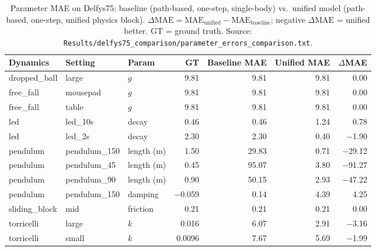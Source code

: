 \begin{table}[t]
  \centering
  \caption{Parameter MAE on Delfys75: baseline (path-based, one-step, single-body) vs.\ unified model (path-based, one-step, unified physics block). $\Delta\mathrm{MAE} = \mathrm{MAE}_{\mathrm{unified}} - \mathrm{MAE}_{\mathrm{baseline}}$; negative $\Delta\mathrm{MAE}$ = unified better. GT = ground truth. Source: \texttt{Results/delfys75\_comparison/parameter\_errors\_comparison.txt}.}
  \label{tab:delfys75_baseline_unified}
  \small
  \begin{tabular}{@{}lllrrrr@{}}
    \toprule
    Dynamics & Setting & Param & GT & Baseline MAE & Unified MAE & $\Delta$MAE \\
    \midrule
    dropped\_ball & large & $g$ & 9.81 & 9.81 & 9.81 & 0.00 \\
    free\_fall & mousepad & $g$ & 9.81 & 9.81 & 9.81 & 0.00 \\
    free\_fall & table & $g$ & 9.81 & 9.81 & 9.81 & 0.00 \\
    led & led\_10s & decay & 0.46 & 0.46 & 1.24 & 0.78 \\
    led & led\_2s & decay & 2.30 & 2.30 & 0.40 & $-$1.90 \\
    pendulum & pendulum\_150 & length (m) & 1.50 & 29.83 & 0.71 & $-$29.12 \\
    pendulum & pendulum\_45 & length (m) & 0.45 & 95.07 & 3.80 & $-$91.27 \\
    pendulum & pendulum\_90 & length (m) & 0.90 & 50.15 & 2.93 & $-$47.22 \\
    pendulum & pendulum\_150 & damping & $-$0.059 & 0.14 & 4.39 & 4.25 \\
    sliding\_block & mid & friction & 0.21 & 0.21 & 0.21 & 0.00 \\
    torricelli & large & $k$ & 0.016 & 6.07 & 2.91 & $-$3.16 \\
    torricelli & small & $k$ & 0.0096 & 7.67 & 5.69 & $-$1.99 \\
    \bottomrule
  \end{tabular}
\end{table}

